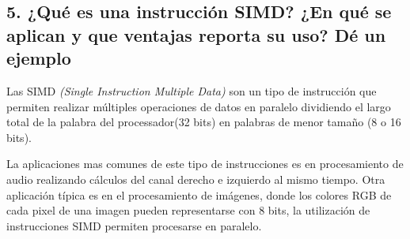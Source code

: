 \documentclass[10pt,a4paper,twoside,spanish]{article}	%
\begin{document}
\subsection*{5. ¿Qué es una instrucción SIMD? ¿En qué se aplican y que ventajas reporta su uso? Dé un ejemplo}

Las SIMD \textit{(Single Instruction Multiple Data)} son un tipo de instrucción que permiten realizar múltiples operaciones de datos en paralelo dividiendo el largo total de la palabra del processador(32 bits) en palabras de menor tamaño (8 o 16 bits).

La aplicaciones mas comunes de este tipo de instrucciones es en procesamiento de audio realizando cálculos del canal derecho e izquierdo al mismo tiempo. Otra aplicación típica es en el procesamiento de imágenes, donde los colores RGB de cada pixel de una imagen pueden representarse con 8 bits, la utilización de instrucciones SIMD permiten procesarse en paralelo.
\end{document}
